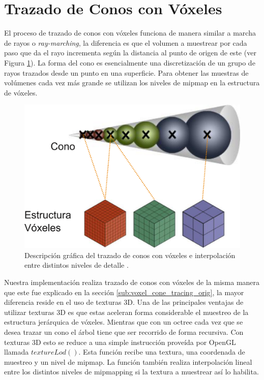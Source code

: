 \section{Trazado de Conos con Vóxeles} %

\label{sec:trazado_de_conos_con_voxeles}

El proceso de trazado de conos con vóxeles funciona de manera similar a marcha de rayos o \emph{ray-marching}, la diferencia es que el volumen a muestrear por cada paso que da el rayo incrementa según la distancia al punto de origen de este (ver Figura \ref{fig:vct_explain}). La forma del cono es esencialmente una discretización de un grupo de rayos trazados desde un punto en una superficie. Para obtener las muestras de volúmenes cada vez más grande se utilizan los niveles de mipmap en la estructura de vóxeles.

\begin{figure}
	\includegraphics[width=0.95\linewidth]{media/vct_explain.png}
	\caption{Descripción gráfica del trazado de conos con vóxeles e interpolación entre distintos niveles de detalle \cite{Oliver:2012:UEE:2341836.2341909}.}
	\label{fig:vct_explain}
\end{figure}

\noindent Nuestra implementación realiza trazado de conos con vóxeles de la misma manera que este fue explicado en la sección \ref{sub:voxel_cone_tracing_orig}, la mayor diferencia reside en el uso de texturas 3D. Una de las principales ventajas de utilizar texturas 3D es que estas aceleran forma considerable el muestreo de la estructura jerárquica de vóxeles. Mientras que con un octree cada vez que se desea trazar un cono el árbol tiene que ser recorrido de forma recursiva. Con texturas 3D esto se reduce a una simple instrucción proveída por OpenGL llamada $textureLod()$. Esta función recibe una textura, una coordenada de muestreo y un nivel de mipmap. La función también realiza interpolación lineal entre los distintos niveles de mipmapping si la textura a muestrear así lo habilita.
